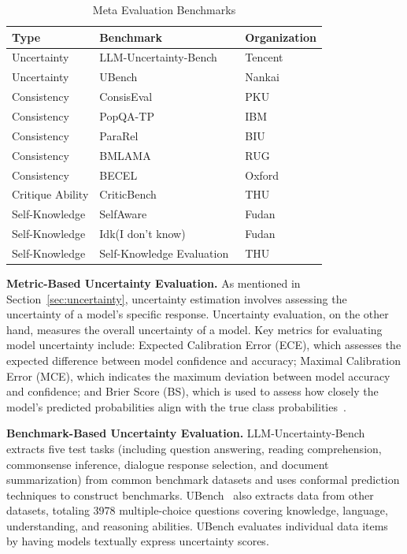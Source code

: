 \documentclass[lettersize,journal]{IEEEtran}
\begin{document}
\begin{table}[h!]
\centering
\caption{Meta Evaluation Benchmarks} \label{tab:meta_eval}
\begin{tabular}{lll}
\toprule
\textbf{Type} & \textbf{Benchmark} & \textbf{Organization} \\
\midrule
Uncertainty & LLM-Uncertainty-Bench~\cite{UncertaintyBench_24_arXiv_Tencent} & Tencent \\
Uncertainty & UBench~\cite{UBench_24_arXiv_Nankai} & Nankai \\
Consistency & ConsisEval~\cite{ConsisEval_24_arXiv_PKU} & PKU \\
Consistency & PopQA-TP~\cite{PopQA_23_GEM_IBM} & IBM \\
Consistency & ParaRel~\cite{ParaRel_21_TACL_BarIlan} & BIU \\
Consistency & BMLAMA~\cite{CrossLingualConsistency_23_EMNLP_UoGroningen} & RUG \\
Consistency & BECEL~\cite{BECEL_22_Coling_Oxford} & Oxford \\
Critique Ability & CriticBench~\cite{CriticBench_24_arXiv_THU} & THU \\
Self-Knowledge & SelfAware~\cite{TheoryKnowUnknown_23_ACL_Fudan} & Fudan \\
Self-Knowledge & Idk(I don't know)~\cite{TheoryKnowUnknown_24_arxiv_Fudan} & Fudan \\
Self-Knowledge &  Self-Knowledge Evaluation~\cite{EvalSelf_24_arXiv_THU} & THU \\
\bottomrule
\end{tabular}
\end{table}


\textbf{Metric-Based Uncertainty Evaluation.} As mentioned in Section~\ref{sec:uncertainty}, uncertainty estimation involves assessing the uncertainty of a model's specific response. Uncertainty evaluation, on the other hand, measures the overall uncertainty of a model. Key metrics for evaluating model uncertainty include: Expected Calibration Error (ECE), which assesses the expected difference between model confidence and accuracy; Maximal Calibration Error (MCE), which indicates the maximum deviation between model accuracy and confidence; and Brier Score (BS), which is used to assess how closely the model’s predicted probabilities align with the true class probabilities~\cite{SurveyUncertainty_23_arXiv_Nankai}.

\textbf{Benchmark-Based Uncertainty Evaluation.} LLM-Uncertainty-Bench~\cite{UncertaintyBench_24_arXiv_Tencent} extracts five test tasks (including question answering, reading comprehension, commonsense inference, dialogue response selection, and document summarization) from common benchmark datasets and uses conformal prediction techniques to construct benchmarks. UBench~\cite{UBench_24_arXiv_Nankai} also extracts data from other datasets, totaling 3978 multiple-choice questions covering knowledge, language, understanding, and reasoning abilities. UBench evaluates individual data items by having models textually express uncertainty scores.
\end{document}
